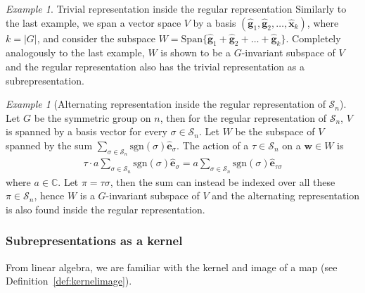 \documentclass[12pt, a4paper, twoside]{article}
\theoremstyle{definition}
\theoremstyle{remark}
\newtheorem{example}[definition]{Example}
\numberwithin{equation}{section}
\newcommand{\CC}{\mathbb{C}}
\newcommand{\1}{\mathbf{1}}
\newcommand{\0}{\mathbf{0}}
\newcommand{\Sym}{\mathcal{S}} %
\newcommand{\sgn}{\text{sgn}}
\newcommand{\Span}{\text{Span}}
\newcommand{\bas}{\mathbf{\hat{e}}}
\newcommand{\ghat}{\mathbf{\hat{g}}}
\newcommand{\xhat}{\mathbf{\hat{x}}}
\newcommand{\wvec}{\mathbf{w}}
\begin{document}
	\begin{example}{Trivial representation inside the regular representation}\cite[Example 1.4.4.]{Sagan}
		Similarly to the last example, we span a vector space $V$ by a basis $(\ghat_1, \ghat_2, \dots, \xhat_{k})$, where $k = |G|$, and consider the subspace $W = \Span\{ \ghat_1 + \ghat_2 + \dots + \ghat_k \}$. Completely analogously to the last example, $W$ is shown to be a $G$-invariant subspace of $V$ and the regular representation also has the trivial representation as a subrepresentation.
	\end{example}
	
	\begin{example}[Alternating representation inside the regular representation of $\Sym_n$]\cite[Example 1.4.4.]{Sagan}
		Let $G$ be the symmetric group on $n$, then for the regular representation of $\Sym_n$, $V$ is spanned by a basis vector for every $\sigma \in \Sym_n$. Let $W$ be the subspace of $V$ spanned by the sum $\sum_{\sigma \in \Sym_n} \sgn(\sigma) \bas_{\sigma}$. The action of a $\tau \in \Sym_n$ on a $\wvec \in W$ is
		\begin{align*}
			\tau \cdot a\sum_{\sigma \in \Sym_n} \sgn(\sigma) \bas_{\sigma} = a \sum_{\sigma \in \Sym_n} \sgn(\sigma) \bas_{\tau\sigma} 
		\end{align*}
		where $a \in \CC$. Let $\pi = \tau\sigma$, then the sum can instead be indexed over all these $\pi \in \Sym_n$, hence $W$ is a $G$-invariant subspace of $V$ and the alternating representation is also found inside the regular representation.
	\end{example}
	
\subsubsection{Subrepresentations as a kernel}
	
	From linear algebra, we are familiar with the kernel and image of a map (see Definition~\ref{def:kernelimage}).
	
\end{document}
